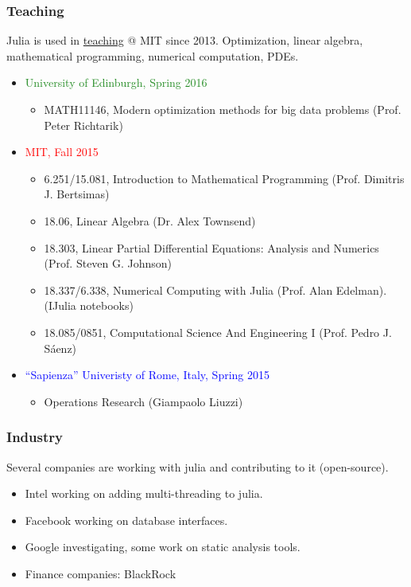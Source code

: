 \documentclass[16pt]{beamer}
\begin{document}
\begin{frame}
\frametitle{Teaching}
Julia is used in \href{http://julialang.org/teaching/}{teaching} @ MIT since 2013.
Optimization, linear algebra, mathematical programming, numerical computation, PDEs.

\begin{itemize}
  \item \textcolor{ForestGreen}{University of Edinburgh, Spring 2016}
  \begin{itemize}
    \item MATH11146, Modern optimization methods for big data problems (Prof. Peter Richtarik)
  \end{itemize}
  
  \item \textcolor{red}{MIT, Fall 2015}
  \begin{itemize}
    \item 6.251/15.081, Introduction to Mathematical Programming (Prof. Dimitris J. Bertsimas)
    \item 18.06, Linear Algebra (Dr. Alex Townsend)
    \item 18.303, Linear Partial Differential Equations: Analysis and Numerics (Prof. Steven G. Johnson)
    \item 18.337/6.338, Numerical Computing with Julia (Prof. Alan Edelman). (IJulia notebooks)
    \item 18.085/0851, Computational Science And Engineering I (Prof. Pedro J. Sáenz)
  \end{itemize}
  
  \item \textcolor{blue}{“Sapienza” Univeristy of Rome, Italy, Spring 2015}
  \begin{itemize}
    \item Operations Research (Giampaolo Liuzzi)
  \end{itemize}

\end{itemize}
\end{frame}

\begin{frame}
\frametitle{Industry}
Several companies are working with julia and contributing to it (open-source).

\begin{itemize}
  \item Intel working on adding multi-threading to julia.
  \item Facebook working on database interfaces.
  \item Google investigating, some work on static analysis tools.
  \item Finance companies: BlackRock
\end{itemize}
\end{frame}
\end{document}
